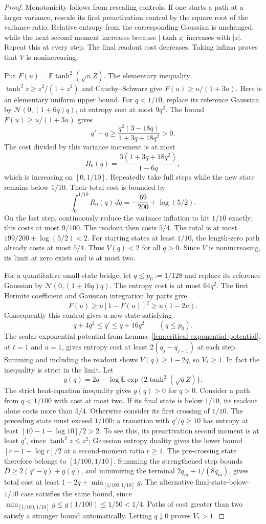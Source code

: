 \begin{proof}
Monotonicity follows from rescaling controls. If one starts a path at a
larger variance, rescale its first preactivation control by the square
root of the variance ratio. Relative entropy from the corresponding
Gaussian is unchanged, while the next second moment increases because
$|\tanh z|$ increases with $|z|$. Repeat this at every step. The final
readout cost decreases. Taking infima proves that $V$ is nonincreasing.

Put $F(u)=\mathbb E\tanh^2(\sqrt uZ)$. The elementary inequality
$\tanh^2z\ge z^2/(1+z^2)$ and Cauchy--Schwarz give
$F(u)\ge u/(1+3u)$.
Here is an elementary uniform upper bound. For $q<1/10$, replace its
reference Gaussian by $\mathcal N(0,(1+6q)q)$, at entropy cost at most
$9q^2$. The bound $F(u)\ge u/(1+3u)$ gives
\[
 q'-q\ge\frac{q^2(3-18q)}{1+3q+18q^2}>0.
\]
The cost divided by this variance increment is at most
\[
 R_0(q)=\frac{3(1+3q+18q^2)}{1-6q},
\]
which is increasing on $[0,1/10]$. Repeatedly take full steps while the
new state remains below $1/10$. Their total cost is bounded by
\[
 \int_0^{1/10}R_0(q)\,dq=-\frac{69}{200}+\log(5/2).
\]
On the last step, continuously reduce the variance inflation to hit
$1/10$ exactly; this costs at most $9/100$. The readout then costs
$5/4$. The total is at most $199/200+\log(5/2)<2$.
For starting states at least $1/10$, the length-zero path already costs
at most $5/4$. Thus $V(q)<2$ for all $q>0$.
Since $V$ is nonincreasing, its limit at zero exists and is at most two.

For a quantitative small-state bridge, let $q\le p_0:=1/128$ and
replace its reference Gaussian by
$\mathcal N(0,(1+16q)q)$. The entropy cost is at most $64q^2$.
The first Hermite coefficient
and Gaussian integration by parts give
\[
 F(u)\ge u[1-F(u)]^2\ge u(1-2u).
\]
Consequently this control gives a new state satisfying
\[
 q+4q^2\le q'\le q+16q^2\qquad(q\le p_0).
\]
The scalar exponential potential from
Lemma~\ref{lem:critical-exponential-potential}, at $t=1$ and $a=1$,
gives entropy cost at least $2(q_j-q_{j-1})$ at each step. Summing and
including the readout shows $V(q)\ge1-2q$, so $V_*\ge1$.
In fact the inequality is strict in the limit. Let
\[
 g(q)=2q-\log\mathbb E\exp\{2\tanh^2(\sqrt qZ)\}.
\]
The strict heat-equation inequality gives $g(q)>0$ for $q>0$.
Consider a path from $q<1/100$ with cost at most two. If its final
state is below $1/10$, its readout alone costs more than $5/4$.
Otherwise consider its first crossing of $1/10$.
The preceding state must exceed $1/100$: a transition with
$q'/q\ge10$ has entropy at least
$[10-1-\log10]/2>2$. To see this, its preactivation second moment
is at least $q'$, since $\tanh^2z\le z^2$; Gaussian entropy duality
gives the lower bound $[r-1-\log r]/2$ at a second-moment ratio $r\ge1$.
The pre-crossing state therefore belongs to $[1/100,1/10]$.
Summing the strengthened step bounds
$D\ge2(q'-q)+g(q)$, and minimizing the terminal
$2q_m+1/(8q_m)$, gives total cost at least
$1-2q+\min_{[1/100,1/10]}g$.
The alternative final-state-below-$1/10$ case satisfies the same bound,
since $\min_{[1/100,1/10]}g\le g(1/100)\le1/50<1/4$.
Paths of cost greater than two satisfy a stronger bound automatically.
Letting $q\downarrow0$ proves $V_*>1$.


\end{proof}
